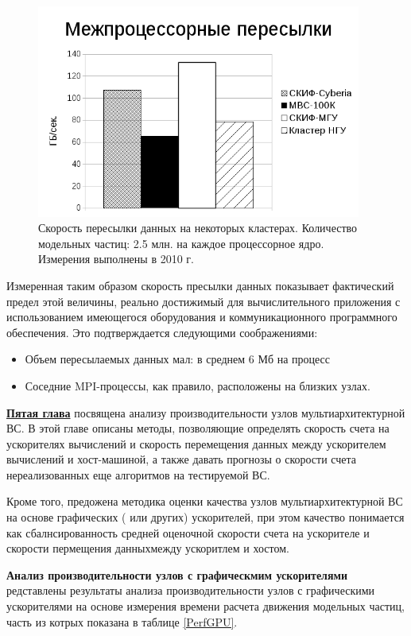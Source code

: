 \begin{figure}[htb]
	\begin{center}
		\includegraphics[height=7cm,keepaspectratio]{images/particle_send_GBsec.png}
	\end{center}
	\caption{Скорость пересылки данных на некоторых кластерах. Количество модельных частиц: 2.5 млн. на каждое процессорное ядро. Измерения выполнены в 2010 г.}
	\label{procs_flops}
\end{figure}

Измеренная таким образом скорость пресылки данных показывает фактический предел этой величины, реально достижимый для вычислительного приложения с использованием имеющегося оборудования и коммуникационного программного обеспечения. Это подтверждается следующими соображениями:
\begin{itemize}
	\item Объем пересылаемых данных мал: в среднем 6 Мб на процесс
	\item Соседние MPI-процессы, как правило, расположены на близких узлах.
\end{itemize}  	 


\underline{\textbf{Пятая глава}} посвящена 
анализу производительности узлов мультиархитектурной ВС.
В этой главе описаны методы, позволяющие определять скорость счета на ускорителях вычислений и скорость перемещения данных между ускорителем вычислений и хост-машиной, а также давать прогнозы о скорости счета нереализованных еще алгоритмов на тестируемой ВС.

Кроме того, предожена методика оценки качества узлов мультиархитектурной ВС на основе графических ( или других) ускорителей, при этом качество понимается как сбалнсированность средней оценочной скорости счета на ускорителе и скорости пермещения данныхмежду ускоритлем и хостом. 

\textbf{Анализ производительности узлов с графическмим ускорителями}
редставлены результаты анализа производительности узлов с графическими ускорителями на основе измерения времени расчета движения модельных частиц, часть из котрых показана в таблице \ref{PerfGPU}.

